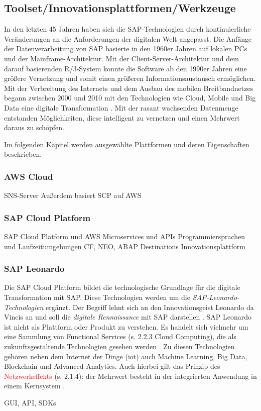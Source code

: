 \subsection{Toolset/Innovationsplattformen/Werkzeuge}
In den letzten 45 Jahren haben sich die SAP-Technologien durch kontinuierliche Veränderungen an die Anforderungen der digitalen Welt angepasst.
Die Anfänge der Datenverarbeitung von SAP basierte in den 1960er Jahren auf lokalen PCs und der Mainframe-Architektur.
Mit der Client-Server-Architektur und dem darauf basierenden R/3-System konnte die Software ab den 1990er Jahren eine größere
Vernetzung und somit einen größeren Informationsaustausch ermöglichen. Mit der Verbreitung des Internets und dem Ausbau des mobilen
Breitbandnetzes begann zwischen 2000 und 2010 mit den Technologien wie Cloud, Mobile und Big Data eine digitale Transformation \citep[S. 44]{Elsner2018}.
Mit der rasant wachsenden Datenmenge entstanden Möglichkeiten, diese intelligent zu vernetzen und einen Mehrwert daraus zu schöpfen.

\par Im folgenden Kapitel werden ausgewählte Plattformen und deren Eigenschaften beschrieben.
\subsubsection{AWS Cloud}
SNS-Server
Außerdem basiert SCP auf AWS
\subsubsection{SAP Cloud Platform}


SAP Cloud Platform und AWS Microservices und APIs
Programmiersprachen und Laufzeitumgebungen
CF, NEO, ABAP
Destinations
Innovationsplattform
\subsubsection{SAP Leonardo}

Die SAP Cloud Platform bildet die technologische Grundlage für die digitale Transformation mit SAP. Diese
Technologien werden um die \textit{SAP-Leonardo-Technologien} ergänzt. Der Begriff lehnt sich an den Innovationsgeist Leonardo da Vincis an und soll die \textit{digitale Rennaissance} mit SAP  darstellen \citep{Howells2017}.
SAP Leonardo ist nicht als Plattform oder Produkt zu verstehen. Es handelt sich vielmehr um eine Sammlung von Functional Services (s. 2.2.3 Cloud Computing), die als zukunftsgestaltende Technologien gesehen werden \citep{Elsner2018}. Zu diesen Technologien
gehören neben dem Internet der Dinge (\acf{iot}) auch Machine Learning, Big Data, Blockchain und Advanced Analytics.
Auch hierbei gilt das Prinzip des \textcolor{red}{Netzwerkeffekts} (s. 2.1.4): der Mehrwert besteht in der integrierten Anwendung in einem Kernsystem \citep{Elsner2018}.

GUI, API, SDKs



\newpage
